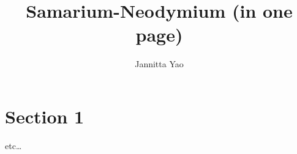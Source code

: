 \documentclass[12pt, letterpaper,twocolumn]{article}
\title{%
    Samarium-Neodymium 
    (in one page) \vspace*{-1ex}}\date{\vspace*{-6ex}}
\author{
    Jannitta Yao %
    }
\begin{document}
\maketitle \thispagestyle{empty}

\section{Section 1}
etc\dots
\end{document}
